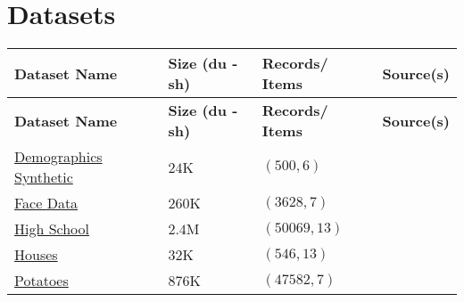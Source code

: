 \chapter*{Datasets}\label{Datasets}



\begin{customArrayStretch}{1.3}
\begin{longtable}{
    |p{4cm}| %
    >{\hfill}p{2.1cm}| %
    >{\hfill}p{2.5cm}| %
    p{2cm}| %
}

\hline
    \textbf{Dataset Name} & 
    \textbf{Size (du -sh)} & 
    \textbf{Records/ Items} & 
    \textbf{Source(s)} \\
\hline
\endfirsthead

\hline
    \textbf{Dataset Name} & 
    \textbf{Size (du -sh)} & 
    \textbf{Records/ Items} & 
    \textbf{Source(s)} \\
\hline
\endhead

\hline \endfoot
\hline \endlastfoot




\href{http://www.nth-iteration.com/wp-content/uploads/2018/08/demographics-synthetic.csv}{Demographics Synthetic} \label{Datasets/nth-iteration/demographics-synthetic} & 
$24$K &
$(500, 6)$ & 
\cite{statistics/book/Statistics-for-Data-Scientists/Maurits-Kaptein} \\ \hline

\href{http://www.nth-iteration.com/wp-content/uploads/2018/08/face-data.csv}{Face Data} \label{Datasets/nth-iteration/face-data} & 
$260$K &
$(3628, 7)$ & 
\cite{statistics/book/Statistics-for-Data-Scientists/Maurits-Kaptein} \\ \hline

\href{http://www.nth-iteration.com/wp-content/uploads/2018/08/high-school.csv}{High School} \label{Datasets/nth-iteration/high-school} & 
$2.4$M &
$(50069, 13)$ & 
\cite{statistics/book/Statistics-for-Data-Scientists/Maurits-Kaptein} \\ \hline

\href{http://www.nth-iteration.com/wp-content/uploads/2018/08/houses.csv}{Houses} \label{Datasets/nth-iteration/houses} & 
$32$K &
$(546, 13)$ & 
\cite{statistics/book/Statistics-for-Data-Scientists/Maurits-Kaptein} \\ \hline

\href{https://drive.google.com/file/d/1GYUk0i9penKnSWODDkZfMzNxK2FUxDi8/view?usp=drive_link}{Potatoes} \label{Datasets/nth-iteration/potatoes} & 
$876$K &
$(47582, 7)$ & 
\cite{statistics/book/Statistics-for-Data-Scientists/Maurits-Kaptein} \\ \hline


\end{longtable}
\end{customArrayStretch}
